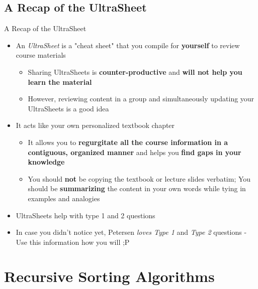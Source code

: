 \documentclass[hyperref={colorlinks,citecolor=blue,linkcolor=blue,urlcolor=blue}, aspectratio=1610]{beamer}
\begin{document}
\subsection{A Recap of the UltraSheet\texttrademark{}}
\begin{frame}{A Recap of the UltraSheet\texttrademark{}}
  \begin{itemize}
    \item An \textit{UltraSheet\texttrademark{}} is a "cheat sheet" that you compile for \textbf{yourself} to review course materials 
    \begin{itemize}
      \item Sharing UltraSheets\texttrademark{} is \textbf{counter-productive} and \textbf{will not help you learn the material}
      \item However, reviewing content in a group and simultaneously updating your UltraSheets\texttrademark{} is a good idea
    \end{itemize}
    \item It acts like your own personalized textbook chapter
    \begin{itemize}
      \item It allows you to \textbf{regurgitate all the course information in a contiguous, organized manner} and helps you \textbf{find gaps in your knowledge}
      \item You should \textbf{not} be copying the textbook or lecture slides verbatim; You should be \textbf{summarizing} the content in your own words while tying in examples and analogies
    \end{itemize}
    \item UltraSheets\texttrademark{} help with type 1 and 2 questions 
  \item In case you didn't notice yet, Petersen \textit{loves Type 1} and \textit{Type 2} questions - Use this information how you will ;P
  \end{itemize}

\end{frame}

\section{Recursive Sorting Algorithms}
\end{document}
